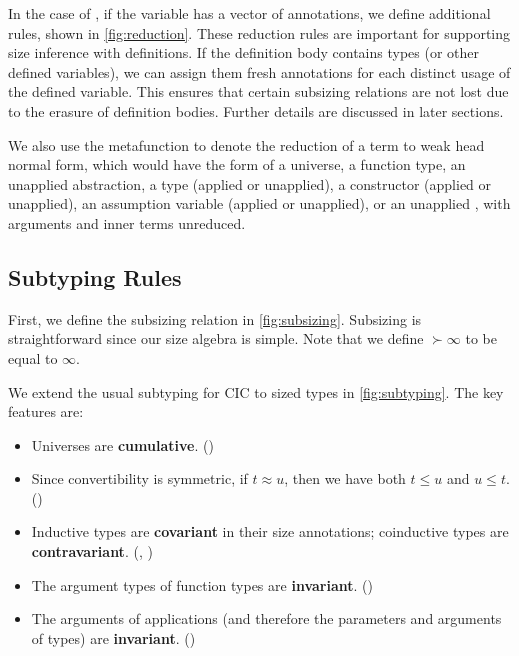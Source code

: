 

In the case of \deltaDeltareduction, if the variable has a vector of annotations, we define additional rules, shown in \autoref{fig:reduction}.
These reduction rules are important for supporting size inference with definitions.
If the definition body contains \coinductive types (or other defined variables), we can assign them fresh annotations for each distinct usage of the defined variable.
This ensures that certain subsizing relations are not lost due to the erasure of definition bodies.
Further details are discussed in later sections.

We also use the metafunction \whnf to denote the reduction of a term to weak head normal form, which would have the form of a universe, a function type, an unapplied abstraction, a \coinductive type (applied or unapplied), a constructor (applied or unapplied), an assumption variable (applied or unapplied), or an unapplied \cofixpoint, with arguments and inner terms unreduced.

\subsection{Subtyping Rules}\label{subsec:typing:subtyping}



First, we define the subsizing relation in \autoref{fig:subsizing}.
Subsizing is straightforward since our size algebra is simple.
Note that we define $\succ{\infty}$ to be equal to $\infty$.



We extend the usual subtyping for CIC to sized types in \autoref{fig:subtyping}.
The key features are:

\begin{itemize}
    \item Universes are \textbf{cumulative}. ()
    \item Since convertibility is symmetric, if $t \approx u$, then we have both $t \leq u$ and $u \leq t$. ()
    \item Inductive types are \textbf{covariant} in their size annotations; coinductive types are \textbf{contravariant}. (, )
    \item The argument types of function types are \textbf{invariant}. ()
    \item The arguments of applications (and therefore the parameters and arguments of \coinductive types) are \textbf{invariant}. ()
\end{itemize}

